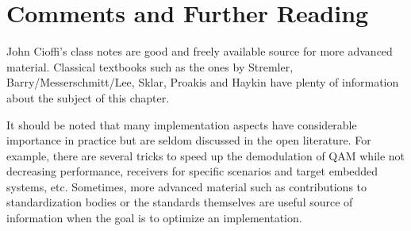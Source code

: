 %

\section{Comments and Further Reading}

John Cioffi's class notes  are good and freely available source for more advanced material.
Classical textbooks such as the ones by Stremler, Barry/Messerschmitt/Lee, Sklar, Proakis and Haykin have plenty of information about the subject of this chapter.

It should be noted that many implementation aspects have considerable importance in practice but are seldom discussed in the open literature. For example, there are several tricks to speed up the demodulation of QAM while not decreasing performance, receivers for specific scenarios and target embedded systems, etc. Sometimes, more advanced material such as contributions to standardization bodies or the standards themselves are useful source of information when the goal is to optimize an implementation.

